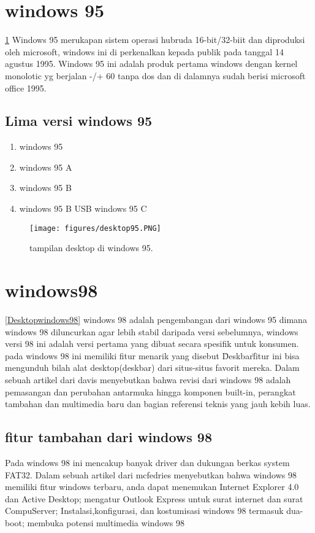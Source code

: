 \begin{enumerate}
\section{windows 95}
\ref{desktop95}
	Windows 95 merukapan sistem operasi hubruda 16-bit/32-biit dan 
	diproduksi oleh microsoft, windows ini di perkenalkan kepada 
	publik pada tanggal 14 agustus 1995. Windows 95 ini adalah produk 
	pertama windows dengan kernel monolotic yg berjalan  -/+  60 tanpa dos 
	dan di dalamnya sudah berisi microsoft office 1995. \cite{petzold1996programming} 
	\subsection{Lima versi windows 95}
\begin{enumerate}
		\item windows 95
		\item windows 95 A
		\item windows 95 B
		\item windows 95 B USB
		\tem windows 95 C
\end{enumerate}

\begin{figure}[ht]
\centerline{\texttt{[image: figures/desktop95.PNG]}}
\caption{tampilan desktop di windows 95.}
\label{desktop95}
\end{figure}

\section{windows98}
		\ref{Desktopwindows98}
	windows 98 adalah pengembangan dari windows 95 dimana windows 98 diluncurkan agar lebih stabil daripada versi sebelumnya, windows versi 98 ini adalah versi pertama yang dibuat secara spesifik untuk konsumen. pada windows 98 ini memiliki fitur menarik yang disebut \"Deskbar\" fitur ini bisa mengunduh bilah alat desktop(deskbar) dari situs-situs favorit mereka.
	Dalam sebuah artikel dari davis menyebutkan bahwa revisi dari windows 98 adalah pemasangan dan perubahan antarmuka hingga komponen built-in, perangkat tambahan dan multimedia baru dan bagian referensi teknis yang jauh kebih luas. \cite{Davis:1998:W9B:551711}
	\subsection{fitur tambahan dari windows 98}
			Pada windows 98 ini mencakup banyak driver dan dukungan berkas system FAT32.
		Dalam sebuah artikel dari mcfedries menyebutkan bahwa windows 98 memiliki fitur windows terbaru, anda dapat menemukan Internet Explorer 4.0 dan Active Desktop; mengatur Outlook Express untuk surat internet dan surat CompuServer; Instalasi,konfigurasi, dan kostumisasi windows 98 termasuk dua-boot; membuka potensi multimedia windows 98 \cite{mcfedries1998windows}


\end{enumerate}
